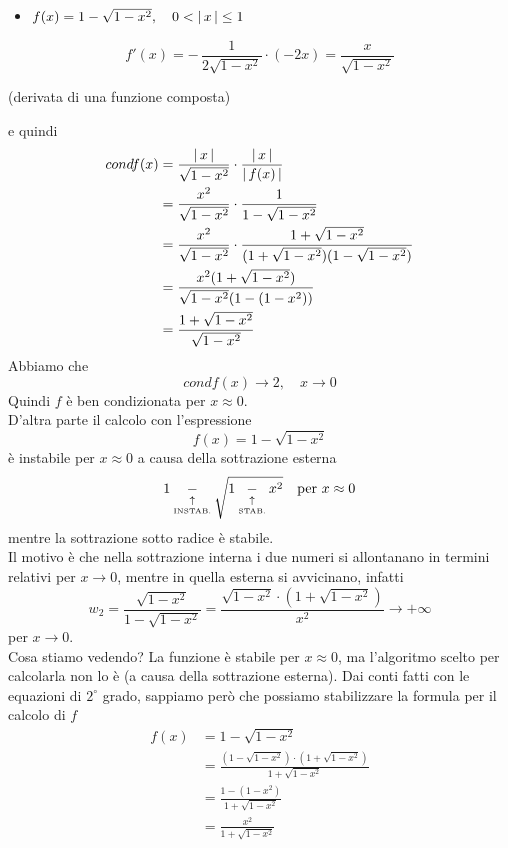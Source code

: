 \begin{itemize} %
    \item $f(x) = 1-\sqrt{1-x^2}, \quad 0 < \lvert\,x\,\rvert \le 1$\\
\end{itemize}
\[ f'(x) = -\,\frac{1}{2\sqrt{1-x^2}} \cdot (-2x) = \frac{x}{\sqrt{1-x^2}} \]
\begin{center}
    (derivata di una funzione composta)
\end{center}
e quindi
\[ \begin{split}
        condf(x) & = \frac{\lvert\,x\,\rvert}{\sqrt{1-x^2}} \cdot \frac{\lvert\,x\,\rvert}{\lvert\,f(x)\,\rvert} \\
        & = \frac{x^2}{\sqrt{1-x^2}} \cdot \frac{1}{1-\sqrt{1-x^2}} \\
        & = \frac{x^2}{\sqrt{1-x^2}}\cdot \frac{1 + \sqrt{1-x^2}}{(1 + \sqrt{1-x^2})(1 - \sqrt{1-x^2})}\\
        & = \frac{x^2(1+\sqrt{1-x^2})}{\sqrt{1-x^2}(1-(1-x^2))} \\
        & = \frac{1+\sqrt{1-x^2}}{\sqrt{1-x^2}} \\
    \end{split} \]
Abbiamo che
\[ condf(x)\rightarrow2, \quad x\rightarrow0 \]
Quindi $f$ è ben condizionata per $x\approx0$.\\ 
D'altra parte il calcolo con l'espressione
\[ f(x)=1-\sqrt{1-x^2} \]
è instabile per $x\approx 0$ a causa della sottrazione esterna 
\[1 \underset{\underset{\text{\tiny{INSTAB.}}}{\uparrow}}{-} \sqrt{1 \underset{\underset{\text{\tiny{STAB.}}}{\uparrow}}{-} x^2} \quad \text{per } x \approx 0\]
mentre la sottrazione sotto radice è stabile.\\
Il motivo è che nella sottrazione interna i due numeri si allontanano in termini relativi per $x \to 0$, mentre in quella esterna si avvicinano, infatti
\[ w_2 = \frac{\sqrt{1-x^2}}{1-\sqrt{1-x^2}} = \frac{\sqrt{1-x^2}\cdot (1+\sqrt{1-x^2})}{x^2} \to +\infty \]
per $x\to 0$.\\
Cosa stiamo vedendo? La funzione è stabile per $x\approx 0$, ma l'algoritmo scelto per calcolarla non lo è (a causa della sottrazione esterna). Dai conti fatti con le equazioni di $2^\circ$ grado, sappiamo però che possiamo stabilizzare la formula per il calcolo di $f$
\[ \begin{split}
    f(x) & = 1-\sqrt{1-x^2} \\
    & = \frac{(1-\sqrt{1-x^2}) \cdot (1+\sqrt{1-x^2})}{1+\sqrt{1-x^2}} \\
    & =\frac{1-(1-x^2)}{1+\sqrt{1-x^2}} \\
    & =\frac{x^2}{1+\sqrt{1-x^2}} 
\end{split} \]
